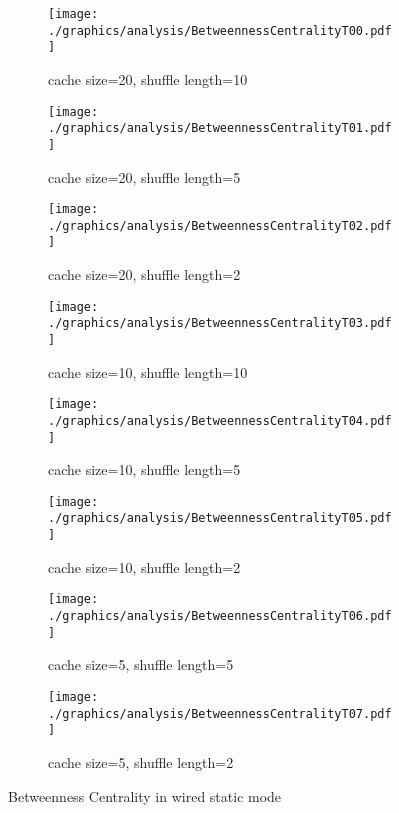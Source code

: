 \begin{figure}
\begin{subfigure}{.5\textwidth}
	\texttt{[image: ./graphics/analysis/BetweennessCentralityT00.pdf]}
	\caption{cache size=20, shuffle
	length=10}
	\label{fig:betweennessCentralityT00small}
\end{subfigure}%
\begin{subfigure}{.5\textwidth}
	\texttt{[image: ./graphics/analysis/BetweennessCentralityT01.pdf]}
	\caption{cache size=20, shuffle
	length=5}
	\label{fig:betweennessCentralityT01small}
\end{subfigure}
\begin{subfigure}{.5\textwidth}
	\texttt{[image: ./graphics/analysis/BetweennessCentralityT02.pdf]}
	\caption{cache size=20, shuffle
	length=2}
	\label{fig:betweennessCentralityT02small}
\end{subfigure}%
\begin{subfigure}{.5\textwidth}
	\texttt{[image: ./graphics/analysis/BetweennessCentralityT03.pdf]}
	\caption{cache size=10, shuffle
	length=10}
	\label{fig:betweennessCentralityT03small}
\end{subfigure}
\begin{subfigure}{.5\textwidth}
	\texttt{[image: ./graphics/analysis/BetweennessCentralityT04.pdf]}
	\caption{cache size=10, shuffle
	length=5}
	\label{fig:betweennessCentralityT04small}
\end{subfigure}%
\begin{subfigure}{.5\textwidth}
	\texttt{[image: ./graphics/analysis/BetweennessCentralityT05.pdf]}
	\caption{cache size=10, shuffle length=2}
	\label{fig:betweennessCentralityT05small}
\end{subfigure}
\begin{subfigure}{.5\textwidth}
	\texttt{[image: ./graphics/analysis/BetweennessCentralityT06.pdf]}
	\caption{cache size=5, shuffle
	length=5}
	\label{fig:betweennessCentralityT06small}
\end{subfigure}%
\begin{subfigure}{.5\textwidth}
	\texttt{[image: ./graphics/analysis/BetweennessCentralityT07.pdf]}
	\caption{cache size=5, shuffle
	length=2}
	\label{fig:betweennessCentralityT07small}
\end{subfigure}
\caption{Betweenness Centrality in wired static mode}
\end{figure}

